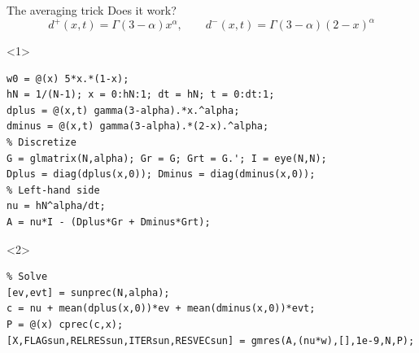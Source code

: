 \documentclass[aspectratio=169,xcolor=dvipsnames]{beamer}
\begin{document}
	\begin{frame}[fragile]{The averaging trick}
	Does it work?
	\[
	d^+(x,t) = \Gamma(3-\alpha)x^\alpha, \qquad d^-(x,t) = \Gamma(3-\alpha) (2-x)^\alpha 
	\]
\begin{onlyenv}<1>
\vspace{-3em}%
\begin{verbatim}
w0 = @(x) 5*x.*(1-x);
hN = 1/(N-1); x = 0:hN:1; dt = hN; t = 0:dt:1;
dplus = @(x,t) gamma(3-alpha).*x.^alpha;
dminus = @(x,t) gamma(3-alpha).*(2-x).^alpha;
% Discretize
G = glmatrix(N,alpha); Gr = G; Grt = G.'; I = eye(N,N);
Dplus = diag(dplus(x,0)); Dminus = diag(dminus(x,0));
% Left-hand side
nu = hN^alpha/dt;
A = nu*I - (Dplus*Gr + Dminus*Grt);
\end{verbatim}
\end{onlyenv}
\begin{onlyenv}<2>
\vspace{-3em}%
\begin{verbatim}
% Solve
[ev,evt] = sunprec(N,alpha);
c = nu + mean(dplus(x,0))*ev + mean(dminus(x,0))*evt;
P = @(x) cprec(c,x);
[X,FLAGsun,RELRESsun,ITERsun,RESVECsun] = gmres(A,(nu*w),[],1e-9,N,P);
\end{verbatim}
\end{onlyenv}
\end{frame}
\end{document}
